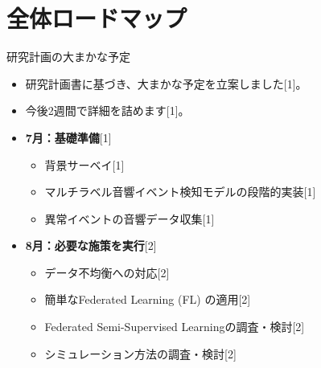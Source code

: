 \documentclass[unicode,12pt,aspectratio=169,dvipdfmx]{beamer}
\begin{document}
\section{全体ロードマップ} %
\begin{frame}{研究計画の大まかな予定} %
    \begin{itemize}
        \item 研究計画書に基づき、大まかな予定を立案しました[1]。
        \item 今後2週間で詳細を詰めます[1]。
        \item \textbf{7月：基礎準備}[1]
        \begin{itemize}
            \item 背景サーベイ[1]
            \item マルチラベル音響イベント検知モデルの段階的実装[1]
            \item 異常イベントの音響データ収集[1]
        \end{itemize}
        \item \textbf{8月：必要な施策を実行}[2]
        \begin{itemize}
            \item データ不均衡への対応[2]
            \item 簡単なFederated Learning (FL) の適用[2]
            \item Federated Semi-Supervised Learningの調査・検討[2]
            \item シミュレーション方法の調査・検討[2]
        \end{itemize}
    \end{itemize}
\end{frame}
\end{document}
